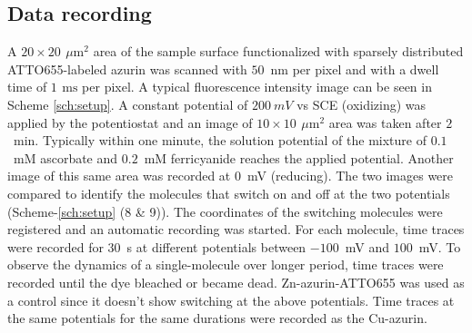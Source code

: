 \documentclass[journal=jacsat,manuscript=article]{achemso}
\newcommand{\um}{\ensuremath{\,\mu\textrm{m}}}
\newcommand{\ms}{\ensuremath{\,\textrm{ms}}}
\begin{document}
\subsection{Data recording}
A $20\times20~\um^2$ area of the sample surface functionalized with sparsely distributed ATTO655-labeled azurin was 
scanned with $50$~nm per pixel and with a dwell time of $1~\ms$ per pixel. A typical fluorescence intensity image can 
be seen in Scheme \ref{sch:setup}. A constant potential of $200~mV$ vs SCE (oxidizing) was applied by the potentiostat 
and an image of $10\times10~\um^2$ area was taken after $2$~min. Typically within one minute, the solution potential 
of the mixture of $0.1$~mM ascorbate and $0.2$~mM ferricyanide reaches the applied potential. Another image of this 
same area was recorded at $0$~mV (reducing). The two images were compared to identify the molecules that switch on 
and off at the two potentials (Scheme-\ref{sch:setup} (8 \& 9)). The coordinates of the switching molecules were 
registered and an automatic recording was started. For each molecule, time traces were recorded for $30$~s at 
different potentials between $-100$~mV and $100$~mV. To observe the dynamics of a single-molecule over longer 
period, time traces were recorded until the dye  bleached or became dead. Zn-azurin-ATTO655 was used as a control 
since it doesn't show switching at the above potentials. Time traces at the same potentials for the same durations 
were recorded as the Cu-azurin.
\end{document}
